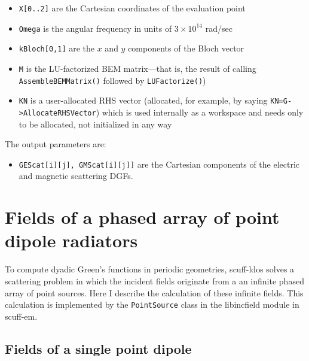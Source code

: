 \documentclass[letterpaper]{article}
\begin{document}
\begin{itemize}
 \item \texttt{X[0..2]} are the Cartesian coordinates of the evaluation point
 \item \texttt{Omega} is the angular frequency in units of $3\times 10^{14}$ rad/sec
 \item \texttt{kBloch[0,1]} are the $x$ and $y$ components of the Bloch vector
 \item \texttt{M} is the LU-factorized BEM matrix---that is, the result of 
       calling \texttt{AssembleBEMMatrix()} followed by \texttt{LUFactorize()})
 \item \texttt{KN} is a user-allocated RHS vector (allocated, for example,
       by saying \texttt{KN=G->AllocateRHSVector}) which is used internally
       as a workspace and needs only to be allocated, not initialized in any way
\end{itemize}

The output parameters are:

\begin{itemize}
 \item \texttt{GEScat[i][j], GMScat[i][j]]} are the Cartesian components of the 
       electric and magnetic scattering DGFs.
\end{itemize}

\appendix
\newpage 
\section{Fields of a phased array of point dipole radiators}
\label{DipoleFieldsAppendix}

To compute dyadic Green's functions in periodic geometries,
{\sc scuff-ldos} solves a scattering problem in which the
incident fields originate from a an infinite phased array
of point sources. Here I describe the calculation of these
infinite fields. This calculation is implemented by the 
\texttt{PointSource} 
class in the {\sc libincfield} module in {\sc scuff-em}.

\subsection*{Fields of a single point dipole}
\end{document}

